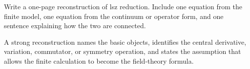 \begin{exercise}
Write a one-page reconstruction of lsz reduction.  Include one equation from the finite model, one equation from the continuum or operator form, and one sentence explaining how the two are connected.
\begin{answer}
A strong reconstruction names the basic objects, identifies the central derivative, variation, commutator, or symmetry operation, and states the assumption that allows the finite calculation to become the field-theory formula.
\end{answer}
\end{exercise}
